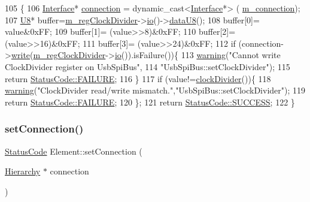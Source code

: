 \begin{DoxyCode}
105                                               \{
106   \hyperlink{classInterface}{Interface}* \hyperlink{classElement_af57444353c1ddf9fa0109801e97debf7}{connection} = \textcolor{keyword}{dynamic\_cast<}\hyperlink{classInterface}{Interface}*\textcolor{keyword}{>} (
      \hyperlink{classElement_abe3de7a5dbbc9a6dd2d7e012e5fdb266}{m\_connection});
107   \hyperlink{ICECALv3_8h_a3cb25ca6f51f003950f9625ff05536fc}{U8}* buffer=\hyperlink{classUsbSpiBus_abfd5f040a0a8c19d972b26ea581bf1f0}{m\_regClockDivider}->\hyperlink{classIOobject_af04fb94137c3d86849f478ac5afab5d1}{io}()->\hyperlink{classIOdata_a75e9c318dbac3a39402179070943d4bc}{dataU8}();
108   buffer[0]= value&0xFF;
109   buffer[1]= (value>>8)&0xFF;
110   buffer[2]= (value>>16)&0xFF;
111   buffer[3]= (value>>24)&0xFF;
112   \textcolor{keywordflow}{if} (connection->\hyperlink{classInterface_ad665cacbaf490a26c1c4ba192022e68a}{write}(\hyperlink{classUsbSpiBus_abfd5f040a0a8c19d972b26ea581bf1f0}{m\_regClockDivider}->\hyperlink{classIOobject_af04fb94137c3d86849f478ac5afab5d1}{io}()).isFailure())\{
113     \hyperlink{classObject_a65cd4fda577711660821fd2cd5a3b4c9}{warning}(\textcolor{stringliteral}{"Cannot write ClockDivider register on UsbSpiBus"},
114         \textcolor{stringliteral}{"UsbSpiBus::setClockDivider"});
115     \textcolor{keywordflow}{return} \hyperlink{classStatusCode_a6f565cbeadc76d14c72f047e5e85eb4ba3da73d4c469762eb9d3c960368252b26}{StatusCode::FAILURE};
116   \} 
117   \textcolor{keywordflow}{if} (value!=\hyperlink{classUsbSpiBus_aa7a56b8aedb646ba46408cb5016dde1c}{clockDivider}())\{
118     \hyperlink{classObject_a65cd4fda577711660821fd2cd5a3b4c9}{warning}(\textcolor{stringliteral}{"ClockDivider read/write mismatch."},\textcolor{stringliteral}{"UsbSpiBus::setClockDivider"});
119     \textcolor{keywordflow}{return} \hyperlink{classStatusCode_a6f565cbeadc76d14c72f047e5e85eb4ba3da73d4c469762eb9d3c960368252b26}{StatusCode::FAILURE};
120   \};
121   \textcolor{keywordflow}{return} \hyperlink{classStatusCode_a6f565cbeadc76d14c72f047e5e85eb4badd0da38d3ba0d922efd1f4619bc37ad8}{StatusCode::SUCCESS};
122 \}
\end{DoxyCode}
\mbox{\label{classElement_ab476b4b1df5954141ceb14f072433b89}} 
\subsubsection{\texorpdfstring{set\+Connection()}{setConnection()}}
{\footnotesize\ttfamily \hyperlink{classStatusCode}{Status\+Code} Element\+::set\+Connection (\begin{DoxyParamCaption}\item[{\hyperlink{classHierarchy}{Hierarchy} $\ast$}]{connection }\end{DoxyParamCaption})\hspace{0.3cm}{\ttfamily [inherited]}}

